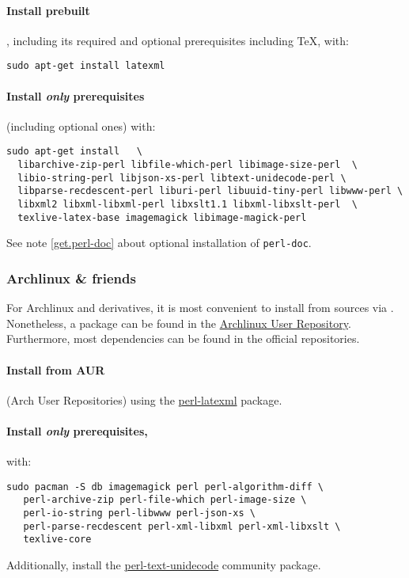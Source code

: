\documentclass{article}
\begin{document}
\paragraph*{Install prebuilt} \LaTeXML, including its required and optional prerequisites
including \TeX, with:
\begin{lstlisting}[style=shell]
sudo apt-get install latexml
\end{lstlisting}

\paragraph*{Install \emph{only} prerequisites}\label{get.linux.debian.prereq}
(including optional ones) with:
\begin{lstlisting}[style=shell]
sudo apt-get install   \
  libarchive-zip-perl libfile-which-perl libimage-size-perl  \
  libio-string-perl libjson-xs-perl libtext-unidecode-perl \
  libparse-recdescent-perl liburi-perl libuuid-tiny-perl libwww-perl \
  libxml2 libxml-libxml-perl libxslt1.1 libxml-libxslt-perl  \
  texlive-latex-base imagemagick libimage-magick-perl
\end{lstlisting}
See note \ref{get.perl-doc} about optional installation of \texttt{perl-doc}.

\subsubsection{Archlinux \& friends}\label{get.linux.arch}
For Archlinux and derivatives, it is most convenient to install from sources via . 
Nonetheless, a package can be found in the \href{https://aur.archlinux.org/}{Archlinux User Repository}.
Furthermore, most dependencies can be found in the official repositories.

\paragraph*{Install from AUR} (Arch User Repositories)
using the \href{https://aur.archlinux.org/packages/perl-latexml/}{perl-latexml} package. 

\paragraph*{Install \emph{only} prerequisites,} with:
\begin{lstlisting}[style=shell]
sudo pacman -S db imagemagick perl perl-algorithm-diff \
   perl-archive-zip perl-file-which perl-image-size \
   perl-io-string perl-libwww perl-json-xs \
   perl-parse-recdescent perl-xml-libxml perl-xml-libxslt \
   texlive-core
\end{lstlisting}
Additionally, install the \href{https://archlinux.org/packages/community/x86_64/perl-text-unidecode/}{perl-text-unidecode}
community package. 
\end{document}
